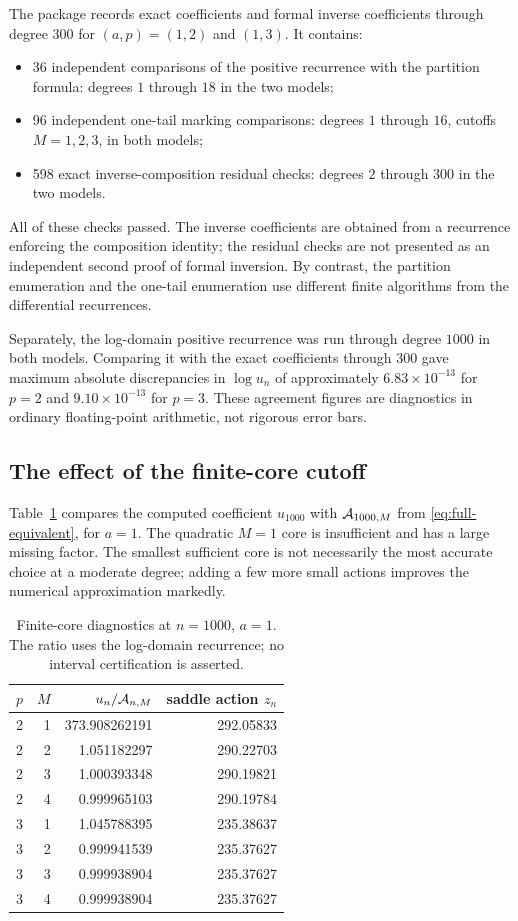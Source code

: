 \documentclass[11pt,a4paper]{article}
\numberwithin{equation}{section}
\theoremstyle{definition}
\theoremstyle{remark}
\begin{document}
The package records exact coefficients and formal inverse coefficients
through degree $300$ for $(a,p)=(1,2)$ and $(1,3)$. It contains:
\begin{itemize}
\item 36 independent comparisons of the positive recurrence with the
partition formula: degrees $1$ through $18$ in the two models;
\item 96 independent one-tail marking comparisons: degrees $1$ through
$16$, cutoffs $M=1,2,3$, in both models;
\item 598 exact inverse-composition residual checks: degrees $2$ through
$300$ in the two models.
\end{itemize}
All of these checks passed. The inverse coefficients are obtained from a
recurrence enforcing the composition identity; the residual checks are not
presented as an independent second proof of formal inversion. By contrast,
the partition enumeration and the one-tail enumeration use different finite
algorithms from the differential recurrences.

Separately, the log-domain positive recurrence was run through degree
$1000$ in both models. Comparing it with the exact coefficients through
$300$ gave maximum absolute discrepancies in $\log u_n$ of approximately
$6.83\times10^{-13}$ for $p=2$ and $9.10\times10^{-13}$ for $p=3$.
These agreement figures are diagnostics in ordinary floating-point
arithmetic, not rigorous error bars.

\subsection{The effect of the finite-core cutoff}

Table~\ref{tab:cutoff} compares the computed coefficient $u_{1000}$ with
$\mathcal A_{1000,M}$ from \eqref{eq:full-equivalent}, for $a=1$.
The quadratic $M=1$ core is insufficient and has a large missing factor.
The smallest sufficient core is not necessarily the most accurate choice
at a moderate degree; adding a few more small actions improves the numerical
approximation markedly.

\begin{table}[htbp]
\centering
\caption{Finite-core diagnostics at $n=1000$, $a=1$. The ratio uses the
log-domain recurrence; no interval certification is asserted.}
\label{tab:cutoff}
\begin{tabular}{rrrr}
\toprule
$p$ & $M$ & $u_n/\mathcal A_{n,M}$ & saddle action $z_n$\\
\midrule
2 & 1 & 373.908262191 & 292.05833 \\
2 & 2 & 1.051182297 & 290.22703 \\
2 & 3 & 1.000393348 & 290.19821 \\
2 & 4 & 0.999965103 & 290.19784 \\
3 & 1 & 1.045788395 & 235.38637 \\
3 & 2 & 0.999941539 & 235.37627 \\
3 & 3 & 0.999938904 & 235.37627 \\
3 & 4 & 0.999938904 & 235.37627 \\
\bottomrule
\end{tabular}
\end{table}
\end{document}
